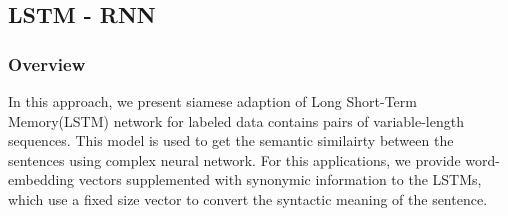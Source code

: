 \subsection{LSTM - RNN}
\subsubsection{Overview}
\par In this approach, we present  siamese adaption of Long Short-Term Memory(LSTM) network for labeled data contains pairs of variable-length sequences. This model is used to get the semantic similairty between the sentences using complex neural network. For this applications, we provide word-embedding vectors supplemented with synonymic information to the LSTMs, which use a fixed size vector to convert the syntactic meaning of the sentence. 

